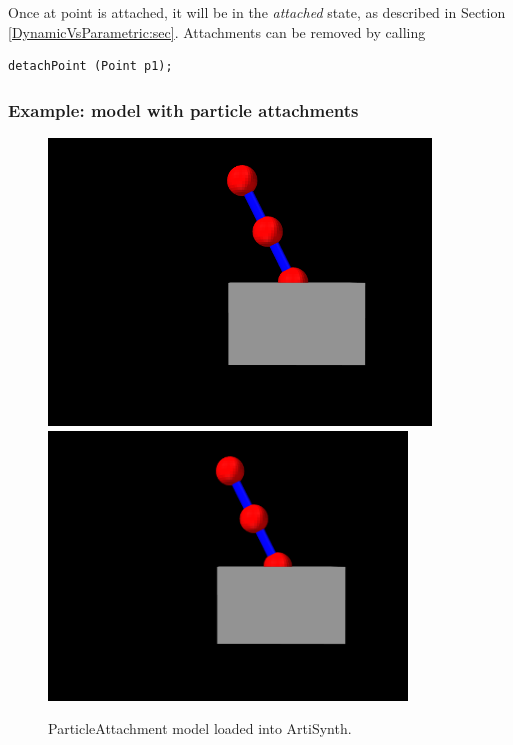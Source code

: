 Once at point is attached, it
will be in the {\it attached} state, as described in Section
\ref{DynamicVsParametric:sec}.  Attachments can be removed by
calling
%
\begin{lstlisting}[]
  detachPoint (Point p1);   
\end{lstlisting}
%

\subsubsection{Example: model with particle attachments}

\begin{figure}[ht]
\begin{center}
\iflatexml
 \includegraphics[]{images/ParticleAttachment}
\else
 \includegraphics[width=3.75in]{images/ParticleAttachment}
\fi
\end{center}
\caption{ParticleAttachment model loaded into ArtiSynth.}
\label{ParticleAttachment:fig}
\end{figure}

